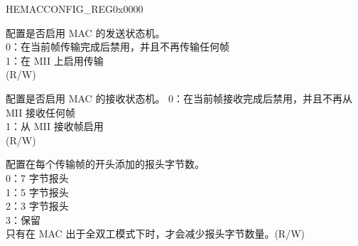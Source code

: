 \addtocounter{Regfloat}{-1}
\begin{register}{H}{EMACCONFIG\_REG}{0x0000}
\begin{regdesc}\begin{reglist}
\item[接上页...]

\item [EMACTX] 配置是否启用 MAC 的发送状态机。\\
0：在当前帧传输完成后禁用，并且不再传输任何帧\\
1：在 MII 上启用传输\\(R/W)


\item [EMACRX] 配置是否启用 MAC 的接收状态机。
0：在当前帧接收完成后禁用，并且不再从 MII 接收任何帧\\
1：从 MII 接收帧启用\\(R/W)
\item [PLTF] 配置在每个传输帧的开头添加的报头字节数。\\
0：7 字节报头\\
1：5 字节报头\\
2：3 字节报头\\
3：保留\\
只有在 MAC 出于全双工模式下时，才会减少报头字节数量。(R/W)
\end{reglist}\end{regdesc}
\end{register}



